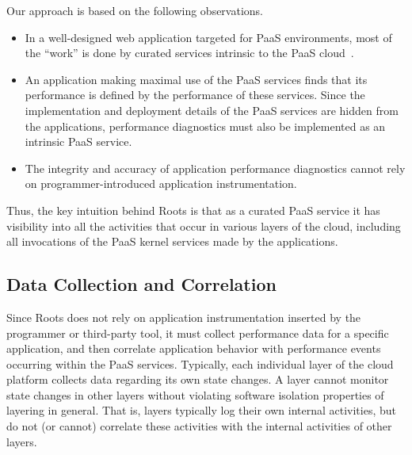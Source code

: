 Our approach is based on the following observations.
\begin{itemize}
\item In a well-designed web application targeted for PaaS environments, 
most of the ``work'' is done by
curated services intrinsic to the PaaS cloud~\cite{Jayathilaka:2015:RTS:2806777.2806842}.
\item An application making maximal use of the PaaS services finds that its
performance is defined by the performance of these services.  Since the 
implementation and deployment details of the PaaS services are hidden
from the applications,
performance diagnostics must also be implemented as an intrinsic PaaS service.
\item The integrity and accuracy of application performance diagnostics
cannot rely on programmer-introduced application instrumentation.
\end{itemize}
Thus, the key intuition behind Roots is that as a curated PaaS service
it has visibility into all the activities that occur in various layers of the cloud,
including all invocations of the PaaS kernel services made by the applications.

%

\subsection{Data Collection and Correlation}

Since Roots does not rely on application instrumentation inserted by the
programmer or third-party tool, it must collect performance data
for a specific application, and then correlate application behavior with performance
events occurring within the PaaS services.
Typically, each individual layer of the cloud platform collects data regarding
its own state changes. A layer cannot monitor state changes
in other layers without violating software isolation properties of
layering in general.   That is, layers typically log their own internal
activities, but do not (or cannot) correlate these activities
with the internal activities of other layers.
 
